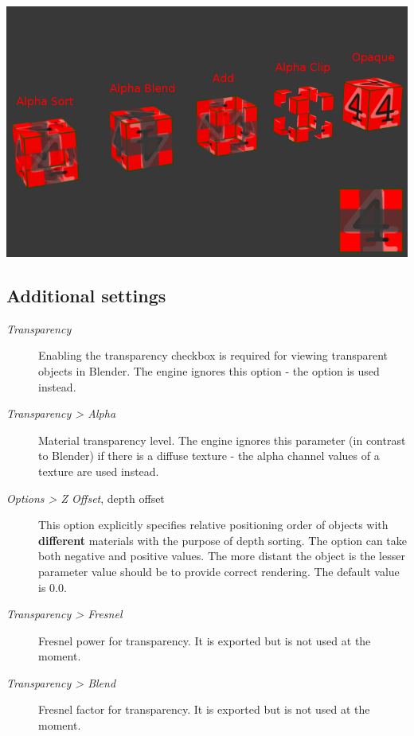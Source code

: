 \documentclass[a4paper,12pt,oneside]{sphinxmanual}
\begin{document}
{\hfill\includegraphics[width=1.000\linewidth]{alpha_types.jpg}\hfill}


\subsection{Additional settings}
\label{materials:index-4}\label{materials:id5}\begin{description}
\item[{\emph{Transparency}}] \leavevmode
Enabling the transparency checkbox is required for viewing transparent objects in Blender. The engine ignores this option - the  option is used instead.

\item[{\emph{Transparency \textgreater{} Alpha}}] \leavevmode
Material transparency level. The engine ignores this parameter (in contrast to Blender) if there is a diffuse texture - the alpha channel values of a texture are used instead.

\item[{\emph{Options \textgreater{} Z Offset}, depth offset}] \leavevmode
This option explicitly specifies relative positioning order of objects with \textbf{different} materials with the purpose of depth sorting. The option can take both negative and positive values. The more distant the object is the lesser parameter value should be to provide correct rendering. The default value is 0.0.

\item[{\emph{Transparency \textgreater{} Fresnel}}] \leavevmode
Fresnel power for transparency. It is exported but is not used at the moment.

\item[{\emph{Transparency \textgreater{} Blend}}] \leavevmode
Fresnel factor for transparency. It is exported but is not used at the moment.

\end{description}
\end{document}
